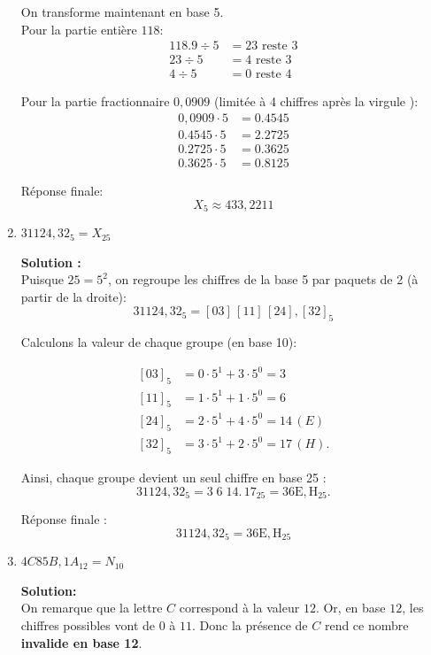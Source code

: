 \documentclass{article}
\begin{document}
\begin{enumerate}[label=\alph*), itemsep=2em]
    On transforme maintenant en base 5. \\
    Pour la partie entière $118$:
    \[
    \begin{aligned}
    118.9 \div 5 &= 23 \text{ reste } 3 \\
    23 \div 5 &= 4 \text{ reste } 3 \\
    4 \div 5 &= 0 \text{ reste } 4
    \end{aligned}
    \]

    Pour la partie fractionnaire $0,0909$ (limitée à 4 chiffres après la virgule ):
    \[
    \begin{aligned}
    0,0909 \cdot 5 &= 0.4545 \\
    0.4545 \cdot 5 &= 2.2725 \\
    0.2725 \cdot 5 &= 0.3625 \\
    0.3625 \cdot 5 &= 0.8125
    \end{aligned}
    \]

    Réponse finale:
    \[
    X_{5} \approx 433,{2211}
    \]
    
    \item $31124,32_{5} = X_{25}$

    \textbf{Solution :}\\
    Puisque $25 = 5^2$, on regroupe les chiffres de la base 5 par paquets de 2 (à partir de la droite):
    \[
    31124,32_{5} = [03]\,[11]\,[24],[32]_{5}
    \]

    Calculons la valeur de chaque groupe (en base 10):

    \[
    \begin{aligned}
    [03]_5 &= 0\cdot5^1 + 3\cdot5^0 = 3\\
    [11]_5 &= 1\cdot5^1 + 1\cdot5^0 = 6\\
    [24]_5 &= 2\cdot5^1 + 4\cdot5^0 = 14 \, (E)\\
    [32]_5 &= 3\cdot5^1 + 2\cdot5^0 = 17 \, (H).
    \end{aligned}
    \]

    Ainsi, chaque groupe devient un seul chiffre en base 25 :
    \[
    31124,32_{5} = 3\;6\;14 .\,17_{25} = 36\mathrm{E},\mathrm{H}_{25}.
    \]

    Réponse finale :
    \[
    31124,32_{5} = 36\mathrm{E},\mathrm{H}_{25}
    \]


    \item $4C85B,1A_{12} = N_{10}$

    \textbf{Solution:} \\
    On remarque que la lettre $C$ correspond à la valeur $12$.  
    Or, en base $12$, les chiffres possibles vont de $0$ à $11$.  
    Donc la présence de $C$ rend ce nombre \textbf{invalide en base 12}. 


\end{enumerate}
\end{document}
